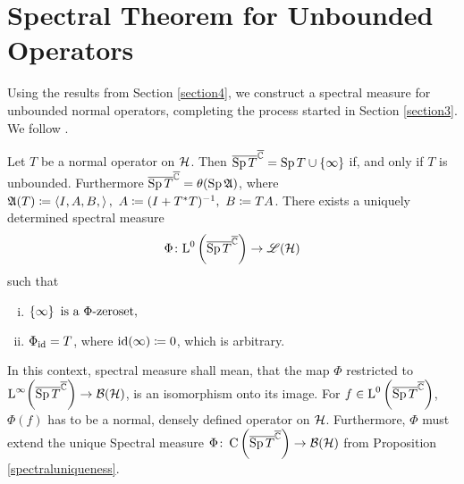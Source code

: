 \section{Spectral Theorem for Unbounded Operators}

Using the results from Section \ref{section4}, we construct a spectral measure
for unbounded normal operators, completing the process started in Section
\ref{section3}. We follow \cite{LesHaupt}.
\begin{thrm}\label{USpectral}
 Let $T$ be a normal operator on $\mathcal{H}$.
 Then $\overline{\operatorname{Sp} T}^{\overline{\mathbb{C}}} = \operatorname{Sp} T \cup \left\lbrace \infty \right\rbrace$ if, and only if 
 $T $ is unbounded.
 Furthermore $\overline{\operatorname{Sp} T}^{\overline{\mathbb{C}}} = \theta(\operatorname{Sp} \mathfrak{A})$, where 
 $\mathfrak{A}(T) \coloneqq \left\langle I, A, B, \right\rangle,~ A \coloneqq (I + T ^{*} T)^{-1},
 ~ B \coloneqq TA$. \newline There exists a uniquely determined spectral measure
 \[
  \Phi \colon \text{L}^0\left( \overline{\operatorname{Sp} T }^{\overline{\mathbb{C}}} \right) \to \mathscr{L}(\mathcal{H})
 \]
 such that
 \begin{enumerate}[(i)]
  \item $
         \left\lbrace \infty \right\rbrace \text{ is a } \Phi\text{-zeroset},
        $
             
  \item $\Phi_{\operatorname{id}} = T$, where $\operatorname{id}(\infty) \coloneqq 0$, which is arbitrary.
 \end{enumerate}

 In this context, spectral measure shall mean, that the map $\Phi$ restricted to  
 $\text{L}^\infty\!\left( \overline{\operatorname{Sp} T }^{\overline{\mathbb{C}}} \right) \to \mathcal{B}(\mathcal{H})$,
 is an isomorphism onto its image. For $f \in 
 \text{L}^0\left( \overline{\operatorname{Sp} T }^{\overline{\mathbb{C}}} \right)$, $\Phi(f)$ has to be 
 a normal, densely defined operator on $\mathcal{H}$. Furthermore, $\Phi$ must extend the 
 unique Spectral measure $\Phi\colon \operatorname{C}\left( \overline{\operatorname{Sp} T }^{\overline{\mathbb{C}}} \right) \to 
 \mathcal{B}(\mathcal{H})$ from Proposition \ref{spectraluniqueness}.
\end{thrm}

